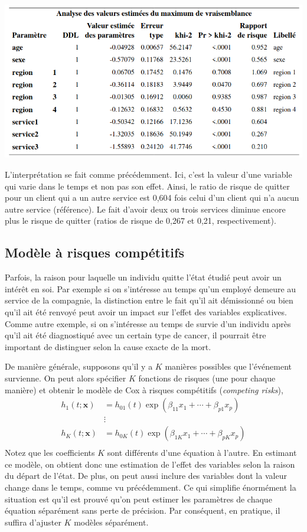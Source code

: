 \documentclass[
  11pt,
  letterpaper,
]{book}
\theoremstyle{definition}
\theoremstyle{definition}
\theoremstyle{definition}
\theoremstyle{remark}
\begin{document}
\begin{center}\includegraphics[width=0.85\linewidth]{figures/05-survie-e22} \end{center}

L'interprétation se fait comme précédemment. Ici, c'est la valeur d'une variable qui varie dans le temps et non pas son effet. Ainsi, le ratio de risque de quitter pour un client qui a un autre service est 0,604 fois celui d'un client qui n'a aucun autre service (référence). Le fait d'avoir deux ou trois services diminue encore plus le risque de quitter (ratios de risque de 0,267 et 0,21, respectivement).

\hypertarget{moduxe8le-uxe0-risques-compuxe9titifs}{%
\subsection{Modèle à risques compétitifs}\label{moduxe8le-uxe0-risques-compuxe9titifs}}

Parfois, la raison pour laquelle un individu quitte l'état étudié peut avoir un intérêt en soi. Par exemple si on s'intéresse au temps qu'un employé demeure au service de la compagnie, la distinction entre le fait qu'il ait démissionné ou bien qu'il ait été renvoyé peut avoir un impact sur l'effet des variables explicatives. Comme autre exemple, si on s'intéresse au temps de survie d'un individu après qu'il ait été diagnostiqué avec un certain type de cancer, il pourrait être important de distinguer selon la cause exacte de la mort.

De manière générale, supposons qu'il y a \(K\) manières possibles que l'événement survienne. On peut alors spécifier \(K\) fonctions de risques (une pour chaque manière) et obtenir le modèle de Cox à risques compétitifs (\emph{competing risks}),
\begin{align*}
h_1(t; \boldsymbol{x})&= h_{01}(t) \exp(\beta_{11}x_1 + \cdots + \beta_{p1} x_p)\\
&\vdots\\
h_K(t; \boldsymbol{x})&= h_{0K}(t) \exp(\beta_{1K}x_1 + \cdots + \beta_{pK} x_p)\\
\end{align*}
Notez que les coefficients \(K\) sont différents d'une équation à l'autre. En estimant ce modèle, on obtient donc une estimation de l'effet des variables selon la raison du départ de l'état. De plus, on peut aussi inclure des variables dont la valeur change dans le temps, comme vu précédemment.
Ce qui simplifie énormément la situation est qu'il est prouvé qu'on peut estimer les paramètres de chaque équation séparément sans perte de précision. Par conséquent, en pratique, il suffira d'ajuster \(K\) modèles séparément.
\end{document}
